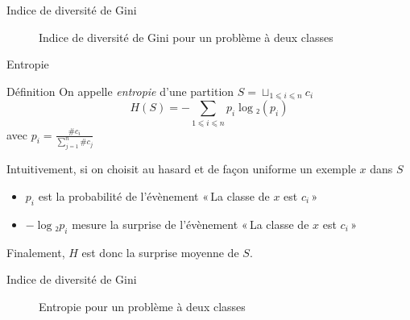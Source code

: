 \documentclass[hyperref={unicode}, xcolor={svgnames}, french]{beamer}
\begin{document}
\begin{frame}{Indice de diversité de Gini}
    \begin{figure}
        \tikzset{external/export=true}
        \caption{Indice de diversité de Gini pour un problème à deux classes}
    \end{figure}
\end{frame}

\begin{frame}{Entropie}
    \begin{block}{Définition}
        On appelle \emph{entropie} d'une partition $S=⊔_{1⩽i⩽n}c_i$
        \begin{equation}
            H(S) = -∑_{1⩽i⩽n}p_i\log₂(p_i)
        \end{equation}
        avec $p_i=\frac{\#c_i}{∑_{j=1}^n\#c_j}$
    \end{block}
    Intuitivement, si on choisit au hasard et de façon uniforme un exemple $x$ dans $S$
    \begin{itemize}
        \item $p_i$ est la probabilité de l'évènement « La classe de $x$ est $c_i$ »
        \item $-\log₂p_i$ mesure la surprise de l'évènement « La classe de $x$ est $c_i$ »
    \end{itemize}
    Finalement, $H$ est donc la surprise moyenne de $S$.
\end{frame}

\begin{frame}{Indice de diversité de Gini}
    \begin{figure}
        \tikzset{external/export=true}
        \caption{Entropie pour un problème à deux classes}
    \end{figure}
\end{frame}
\end{document}
